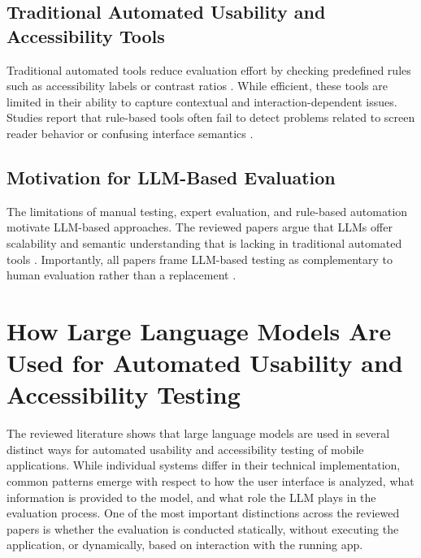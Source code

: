 \documentclass[acmsmall,nonacm]{acmart}
\begin{document}
\subsection{Traditional Automated Usability and Accessibility Tools}

Traditional automated tools reduce evaluation effort by checking predefined rules such as accessibility labels or contrast ratios \cite{zhong2024screenaudit,aljedaani2024llm_accessibility}. While efficient, these tools are limited in their ability to capture contextual and interaction-dependent issues. Studies report that rule-based tools often fail to detect problems related to screen reader behavior or confusing interface semantics \cite{zhong2024screenaudit,yang2023uisgpt,aljedaani2024llm_accessibility}.

\subsection{Motivation for LLM-Based Evaluation}

The limitations of manual testing, expert evaluation, and rule-based automation motivate LLM-based approaches. The reviewed papers argue that LLMs offer scalability and semantic understanding that is lacking in traditional automated tools \cite{xiang2023simuser,zhong2023synthetic_heuristic,wang2024aiheureval}. Importantly, all papers frame LLM-based testing as complementary to human evaluation rather than a replacement \cite{xiang2023simuser,zhong2023synthetic_heuristic,zhong2024screenaudit,wang2024aiheureval,yang2023uisgpt,aljedaani2024llm_accessibility}.

\section{How Large Language Models Are Used for Automated Usability and Accessibility Testing}

The reviewed literature shows that large language models are used in several distinct ways for automated usability and accessibility testing of mobile applications. While individual systems differ in their technical implementation, common patterns emerge with respect to how the user interface is analyzed, what information is provided to the model, and what role the LLM plays in the evaluation process. One of the most important distinctions across the reviewed papers is whether the evaluation is conducted statically, without executing the application, or dynamically, based on interaction with the running app.
\end{document}
